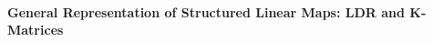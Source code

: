 

%
%
%
%
%
%
%
%
%
%



\paragraph{General Representation of Structured Linear Maps: LDR and K-Matrices} ~\\

